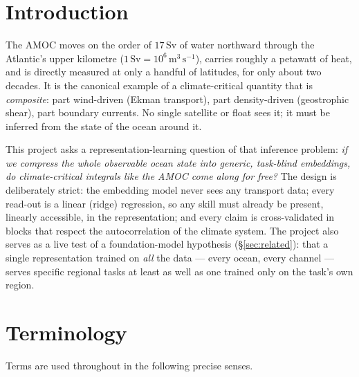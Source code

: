 \documentclass[10pt]{article}
\begin{document}
\section{Introduction}

The AMOC moves on the order of $17$\,Sv of water northward through the
Atlantic's upper kilometre ($1\,\mathrm{Sv}=10^6\,\mathrm{m^3\,s^{-1}}$),
carries roughly a petawatt of heat, and is directly measured at only a
handful of latitudes, for only about two decades. It is the canonical
example of a climate-critical quantity that is \emph{composite}: part
wind-driven (Ekman transport), part density-driven (geostrophic shear),
part boundary currents. No single satellite or float sees it; it must be
inferred from the state of the ocean around it.

This project asks a representation-learning question of that inference
problem: \emph{if we compress the whole observable ocean state into
generic, task-blind embeddings, do climate-critical integrals like the
AMOC come along for free?} The design is deliberately strict: the
embedding model never sees any transport data; every read-out is a
linear (ridge) regression, so any skill must already be present,
linearly accessible, in the representation; and every claim is
cross-validated in blocks that respect the autocorrelation of the
climate system. The project also serves as a live test of a
foundation-model hypothesis (\S\ref{sec:related}): that a single
representation trained on \emph{all} the data --- every ocean, every
channel --- serves specific regional tasks at least as well as one
trained only on the task's own region.

\section{Terminology}\label{sec:gloss}

Terms are used throughout in the following precise senses.
\end{document}
